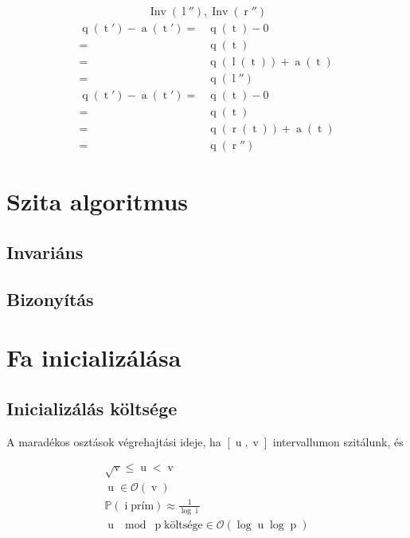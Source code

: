 \documentclass{article}
\newcommand*{\bigOrdo}{\ensuremath{\mathcal{O}}}
\newcommand*{\fInv}{\ensuremath{\operatorname{Inv}}}
\newcommand*{\sAccumulated}[1]{\ensuremath{\operatorname{a}\left(#1\right)}}
\newcommand*{\sLeft}[1]{\ensuremath{\operatorname{l}\left(#1\right)}}
\newcommand*{\sPosition}[1]{\ensuremath{\operatorname{q}\left(#1\right)}}
\newcommand*{\sRight}[1]{\ensuremath{\operatorname{r}\left(#1\right)}}
\newcommand*{\vI}{\ensuremath{\operatorname{i}}}
\newcommand*{\vL}{\ensuremath{\operatorname{l}}}
\newcommand*{\vP}{\ensuremath{\operatorname{p}}}
\newcommand*{\vR}{\ensuremath{\operatorname{r}}}
\newcommand*{\vT}{\ensuremath{\operatorname{t}}}
\newcommand*{\vU}{\ensuremath{\operatorname{u}}}
\newcommand*{\vV}{\ensuremath{\operatorname{v}}}
\begin{document}
\begin{align*}
\fInv(\vL''), \fInv(\vR'') \tag{I3}
\end{align*}
\begin{align*}
\sPosition{\vT'} - \sAccumulated{\vT'}
	=& \sPosition{\vT} - 0 \\
	=& \sPosition{\vT} \\
	=& \sPosition{\sLeft{\vT}} + \sAccumulated{\vT} \\
	=& \sPosition{\vL''} \\
\sPosition{\vT'} - \sAccumulated{\vT'}
	=& \sPosition{\vT} - 0 \\
	=& \sPosition{\vT} \\
	=& \sPosition{\sRight{\vT}} + \sAccumulated{\vT} \\
	=& \sPosition{\vR''} \tag{I4, F5}
\end{align*}

\section{Szita algoritmus}

\subsection{Invariáns}

\subsection*{Bizonyítás}

\section{Fa inicializálása}

\subsection{Inicializálás költsége}

A maradékos osztások végrehajtási ideje, ha $ \left[\vU, \vV\right] $ intervallumon szitálunk,
és

\begin{align*}
\sqrt{\vV} \le \vU < \vV \\
\vU \in \bigOrdo(\vV) \\
\mathbb{P}(\vI \text{prím}) \approx \frac{1}{\log{\vI}} \\
\vU \mod \vP \text{költsége} \in \bigOrdo(\log{\vU}\log{\vP})
\end{align*}
\end{document}
